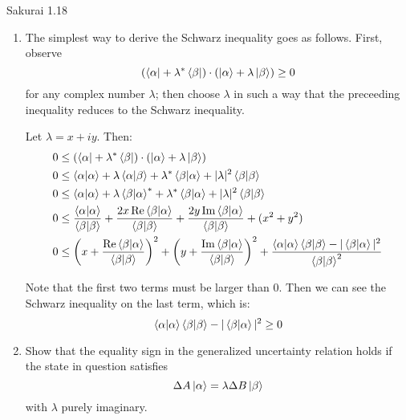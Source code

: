 \documentclass{article}
\begin{document}
	\newpage
	\begin{section}{Sakurai 1.18}
		\newcommand{\expc}[1]{\left<#1\right>}

		\begin{enumerate}
			\item The simplest way to derive the Schwarz inequality goes as follows. First, observe
			$$
			(\bra{\alpha} + \lambda^*\bra{\beta}) \cdot (\ket{\alpha} + \lambda\ket{\beta}) \geq 0
			$$
			for any complex number $\lambda$; then choose $\lambda$ in such a way that the preceeding inequality reduces to the Schwarz inequality.

			\begin{tcolorbox}
				Let $\lambda = x + iy$. Then:
				\begin{align*}
					0 &\leq (\bra{\alpha} + \lambda^*\bra{\beta}) \cdot (\ket{\alpha} + \lambda\ket{\beta}) \\
					0 &\leq \braket{\alpha} + \lambda \braket{\alpha}{\beta} + \lambda^* \braket{\beta}{\alpha} + |\lambda|^2 \braket{\beta} \\
					0 &\leq \braket{\alpha} + \lambda \braket{\beta}{\alpha}^* + \lambda^* \braket{\beta}{\alpha} + |\lambda|^2 \braket{\beta} \\
					0 &\leq \frac{\braket{\alpha}}{\braket{\beta}} + \frac{2x \Re \braket{\beta}{\alpha}}{\braket{\beta}} + \frac{2y \Im \braket{\beta}{\alpha}}{\braket{\beta}} + (x^2 + y^2)\\
					0 &\leq \left(x + \frac{\Re \braket{\beta}{\alpha}}{\braket{\beta}}\right)^2 + \left(y + \frac{\Im \braket{\beta}{\alpha}}{\braket{\beta}}\right)^2 + \frac{\braket{\alpha}\braket{\beta} - |\braket{\beta}{\alpha}|^2}{\braket{\beta}^2} \\
				\end{align*}

				Note that the first two terms must be larger than $0$. Then we can see the Schwarz inequality on the last term, which is:
				\begin{equation*}
					\braket{\alpha}\braket{\beta} - |\braket{\beta}{\alpha}|^2 \geq 0
				\end{equation*}
			\end{tcolorbox}

			\item Show that the equality sign in the generalized uncertainty relation holds if the state in question satisfies
			$$
				\Delta A \ket{\alpha} = \lambda \Delta B \ket{\beta}
			$$
			with $\lambda$ purely imaginary.


\end{enumerate}
\end{section}
\end{document}
